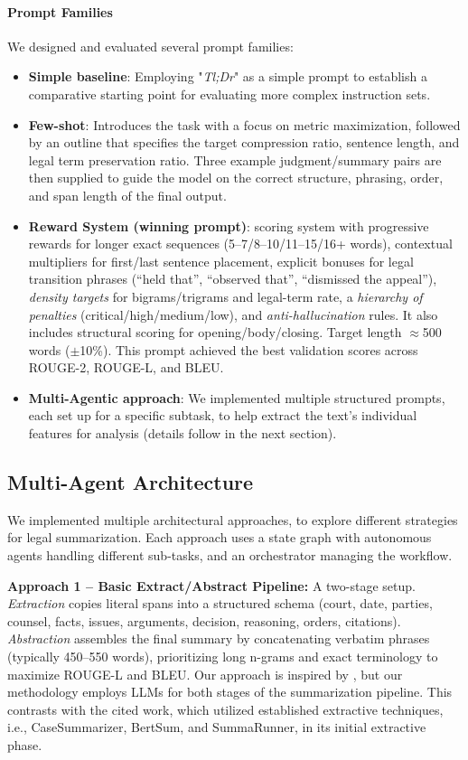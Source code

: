 \documentclass[sigconf]{acmart}
\begin{document}
\paragraph{Prompt Families}
We designed and evaluated several prompt families:
\begin{itemize}
  \item \textbf{Simple baseline}: Employing "\emph{Tl;Dr}" as a simple prompt to establish a comparative starting point for evaluating more complex instruction sets.
  \item \textbf{Few-shot}: Introduces the task with a focus on metric maximization, followed by an outline that specifies the target compression ratio, sentence length, and legal term preservation ratio. Three example judgment/summary pairs are then supplied to guide the model on the correct structure, phrasing, order, and span length of the final output.
  \item \textbf{Reward System (winning prompt)}: scoring system with progressive rewards for longer exact sequences (5–7/8–10/11–15/16+ words), contextual multipliers for first/last sentence placement, explicit bonuses for legal transition phrases (\enquote{held that}, \enquote{observed that}, \enquote{dismissed the appeal}), \emph{density targets} for bigrams/trigrams and legal-term rate, a \emph{hierarchy of penalties} (critical/high/medium/low), and \emph{anti-hallucination} rules. It also includes structural scoring for opening/body/closing. Target length \(\approx\)500 words (\(\pm\)10\%). This prompt achieved the best validation scores across ROUGE-2, ROUGE-L, and BLEU.
  \item \textbf{Multi-Agentic approach}: We implemented multiple structured prompts, each set up for a specific subtask, to help extract the text's individual features for analysis (details follow in the next section).
\end{itemize}

\subsection{Multi-Agent Architecture}
We implemented multiple architectural approaches, to explore different strategies for legal summarization. Each approach uses a state graph with autonomous agents handling different sub-tasks, and an orchestrator managing the workflow.

\textbf{Approach 1 – Basic Extract/Abstract Pipeline:}  A two-stage setup. \emph{Extraction} copies literal spans into a structured schema (court, date, parties, counsel, facts, issues, arguments, decision, reasoning, orders, citations). \emph{Abstraction} assembles the final summary by concatenating verbatim phrases (typically 450–550 words), prioritizing long n-grams and exact terminology to maximize ROUGE-L and BLEU. Our approach is inspired by \citet{deroy2024applicability}, but our methodology employs LLMs for both stages of the summarization pipeline. This contrasts with the cited work, which utilized established extractive techniques, i.e., CaseSummarizer, BertSum, and SummaRunner, in its initial extractive phase.
\end{document}
